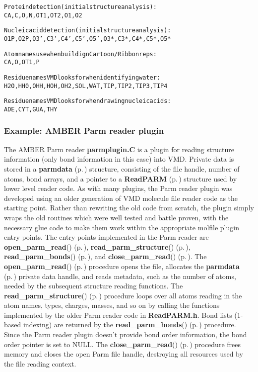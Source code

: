 \small\begin{alltt}
Protein detection (initial structure analysis):
  CA, C, O, N, OT1, OT2, O1, O2
  
Nucleic acid detection (initial structure analysis):
  O1P, O2P, O3', C3', C4', C5', O5', O3*, C3*, C4*, C5*, O5*

Atom names use when buildign Cartoon/Ribbon reps:
  CA, O, OT1, P

Residue names VMD looks for when identifying water:
  H2O, HH0, OHH, HOH, OH2, SOL, WAT, TIP, TIP2, TIP3, TIP4

Residue names VMD looks for when drawing nucleic acids:
  ADE, CYT, GUA, THY
\end{alltt}\normalsize 




 \subsubsection*{Example: AMBER Parm reader plugin}
 The AMBER Parm reader {\bf parmplugin.C} is a plugin for reading structure information (only bond information in this case) into VMD. Private data is stored in a {\bf parmdata} {\rm (p.\,\pageref{structparmdata})} structure, consisting of the file handle, number of atoms, bond arrays, and a pointer to a {\bf Read\-PARM} {\rm (p.\,\pageref{classReadPARM})} structure used by lower level reader code. As with many plugins, the Parm reader plugin was developed using an older generation of VMD molecule file reader code as the starting point. Rather than rewriting the old code from  scratch, the plugin simply wraps the old routines which were well tested and battle proven, with the necessary glue code to make them work within the appropriate molfile plugin entry points. The entry points implemented in the Parm reader are {\bf open\_\-parm\_\-read}() {\rm (p.\,\pageref{parmplugin_8C_a1})}, {\bf read\_\-parm\_\-structure}() {\rm (p.\,\pageref{parmplugin_8C_a2})},  {\bf read\_\-parm\_\-bonds}() {\rm (p.\,\pageref{parmplugin_8C_a3})}, and {\bf close\_\-parm\_\-read}() {\rm (p.\,\pageref{parmplugin_8C_a4})}. The {\bf open\_\-parm\_\-read}() {\rm (p.\,\pageref{parmplugin_8C_a1})} procedure opens the file, allocates the {\bf parmdata} {\rm (p.\,\pageref{structparmdata})} private data handle, and reads metadata, such as the  number of atoms, needed by the subsequent structure reading functions.  The {\bf read\_\-parm\_\-structure}() {\rm (p.\,\pageref{parmplugin_8C_a2})} procedure loops over all atoms reading in the atom names, types, charges, masses, and so on by calling the functions implemented by the older Parm reader code in {\bf Read\-PARM.h}. Bond lists (1-based indexing) are returned by the {\bf read\_\-parm\_\-bonds}() {\rm (p.\,\pageref{parmplugin_8C_a3})}  procedure. Since the Parm reader plugin doesn't provide bond order  information, the bond order pointer is set to NULL. The {\bf close\_\-parm\_\-read}() {\rm (p.\,\pageref{parmplugin_8C_a4})} procedure frees memory and closes the open  Parm file handle, destroying all resources used by the file reading context.



